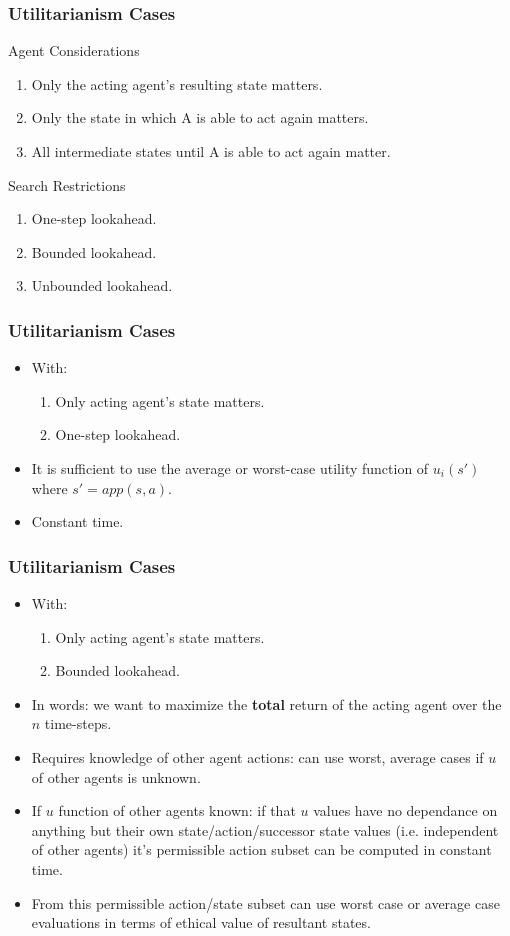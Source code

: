 \documentclass{beamer}
\begin{document}
 \begin{frame}
\frametitle{Utilitarianism Cases}
Agent Considerations
\begin{enumerate}
\item Only the acting agent's resulting state matters.
\item Only the state in which A is able to act again matters.
\item All intermediate states until A is able to act again matter.
\end{enumerate}

Search Restrictions
\begin{enumerate}
\item One-step lookahead.
\item Bounded lookahead.
\item Unbounded lookahead.
\end{enumerate}
 \end{frame} 
 
 
 \begin{frame}
\frametitle{Utilitarianism Cases}

\begin{itemize}
\item With:
\begin{enumerate}
\item Only acting agent's state matters.
\item One-step lookahead.
\end{enumerate}
\item It is sufficient to use the average or worst-case utility function of $u_i(s')$ where $s'=app(s,a)$.
\item Constant time.
\end{itemize}

 \end{frame} 
 
 \begin{frame}
\frametitle{Utilitarianism Cases}

\begin{itemize}
\item With:
\begin{enumerate}
\item Only acting agent's state matters.
\item Bounded lookahead.
\end{enumerate}
\item In words: we want to maximize the \textbf{total} return of the acting agent over the $n$ time-steps.
\item Requires knowledge of other agent actions: can use worst, average cases if $u$ of other agents is unknown.
\item If $u$ function of other agents known: if that $u$ values have no dependance on anything but their own state/action/successor state values (i.e. independent of other agents) it's permissible action subset can be computed in constant time. 
\item From this permissible action/state subset can use worst case or average case evaluations in terms of ethical value of resultant states.

\end{itemize}

 \end{frame} 
  
\end{document}

